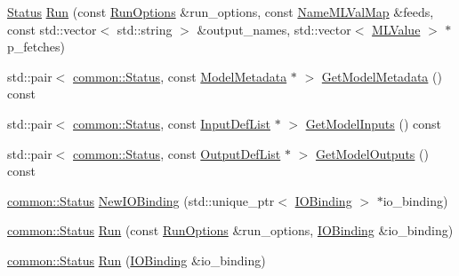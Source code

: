 \begin{DoxyCompactItemize}
\item 
\mbox{\hyperlink{classonnxruntime_1_1common_1_1Status}{Status}} \mbox{\hyperlink{classonnxruntime_1_1InferenceSession_1_1Impl_aec73d9664448eece9c2627d4d378a302}{Run}} (const \mbox{\hyperlink{namespaceonnxruntime_a28ccb3d97f6827bf04d2ce259ff968f1}{Run\+Options}} \&run\+\_\+options, const \mbox{\hyperlink{namespaceonnxruntime_a48b01f0410ec8d693dbd40d1132bd66c}{Name\+M\+L\+Val\+Map}} \&feeds, const std\+::vector$<$ std\+::string $>$ \&output\+\_\+names, std\+::vector$<$ \mbox{\hyperlink{classonnxruntime_1_1MLValue}{M\+L\+Value}} $>$ $\ast$p\+\_\+fetches)
\item 
std\+::pair$<$ \mbox{\hyperlink{classonnxruntime_1_1common_1_1Status}{common\+::\+Status}}, const \mbox{\hyperlink{structonnxruntime_1_1ModelMetadata}{Model\+Metadata}} $\ast$ $>$ \mbox{\hyperlink{classonnxruntime_1_1InferenceSession_1_1Impl_a34dba97aea4524d5d7e10aed1c645c77}{Get\+Model\+Metadata}} () const
\item 
std\+::pair$<$ \mbox{\hyperlink{classonnxruntime_1_1common_1_1Status}{common\+::\+Status}}, const \mbox{\hyperlink{namespaceonnxruntime_ab363b0109a9af018fb3e355aac00a360}{Input\+Def\+List}} $\ast$ $>$ \mbox{\hyperlink{classonnxruntime_1_1InferenceSession_1_1Impl_a4c410afb78ad0c06fc3e52145e83f7f8}{Get\+Model\+Inputs}} () const
\item 
std\+::pair$<$ \mbox{\hyperlink{classonnxruntime_1_1common_1_1Status}{common\+::\+Status}}, const \mbox{\hyperlink{namespaceonnxruntime_a4b3c292f33b95d038b5059f6103f287a}{Output\+Def\+List}} $\ast$ $>$ \mbox{\hyperlink{classonnxruntime_1_1InferenceSession_1_1Impl_ae05b7d6c367e31fb527dd807ddd92fb2}{Get\+Model\+Outputs}} () const
\item 
\mbox{\hyperlink{classonnxruntime_1_1common_1_1Status}{common\+::\+Status}} \mbox{\hyperlink{classonnxruntime_1_1InferenceSession_1_1Impl_a8650ce4e18b0a13a9e9f374d370ad8e5}{New\+I\+O\+Binding}} (std\+::unique\+\_\+ptr$<$ \mbox{\hyperlink{classonnxruntime_1_1IOBinding}{I\+O\+Binding}} $>$ $\ast$io\+\_\+binding)
\item 
\mbox{\hyperlink{classonnxruntime_1_1common_1_1Status}{common\+::\+Status}} \mbox{\hyperlink{classonnxruntime_1_1InferenceSession_1_1Impl_a8c0b0a42c5f4ba3a4fa6cffb730bb5f6}{Run}} (const \mbox{\hyperlink{namespaceonnxruntime_a28ccb3d97f6827bf04d2ce259ff968f1}{Run\+Options}} \&run\+\_\+options, \mbox{\hyperlink{classonnxruntime_1_1IOBinding}{I\+O\+Binding}} \&io\+\_\+binding)
\item 
\mbox{\hyperlink{classonnxruntime_1_1common_1_1Status}{common\+::\+Status}} \mbox{\hyperlink{classonnxruntime_1_1InferenceSession_1_1Impl_ac4b6faace4cc4ef595e2eba3486903f3}{Run}} (\mbox{\hyperlink{classonnxruntime_1_1IOBinding}{I\+O\+Binding}} \&io\+\_\+binding)

\end{DoxyCompactItemize}
